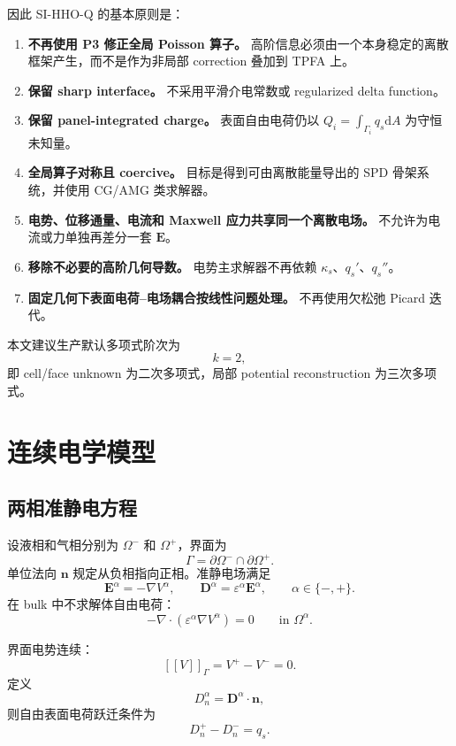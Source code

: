 \documentclass[UTF8,a4paper,11pt]{ctexart}
\newcommand{\dd}{\mathrm{d}}
\newcommand{\jump}[1]{\left[\!\left[#1\right]\!\right]}
\newcommand{\eps}{\varepsilon}
\newcommand{\vct}[1]{\bm{#1}}
\begin{document}
因此 SI-HHO-Q 的基本原则是：
\begin{enumerate}[label=\arabic*)]
  \item \textbf{不再使用 P3 修正全局 Poisson 算子。} 高阶信息必须由一个本身稳定的离散框架产生，而不是作为非局部 correction 叠加到 TPFA 上。
  \item \textbf{保留 sharp interface。} 不采用平滑介电常数或 regularized delta function。
  \item \textbf{保留 panel-integrated charge。} 表面自由电荷仍以 \(Q_i=\int_{\Gamma_i}q_s\dd A\) 为守恒未知量。
  \item \textbf{全局算子对称且 coercive。} 目标是得到可由离散能量导出的 SPD 骨架系统，并使用 CG/AMG 类求解器。
  \item \textbf{电势、位移通量、电流和 Maxwell 应力共享同一个离散电场。} 不允许为电流或力单独再差分一套 \(\vct E\)。
  \item \textbf{移除不必要的高阶几何导数。} 电势主求解器不再依赖 \(\kappa_s\)、\(q_s'\)、\(q_s''\)。
  \item \textbf{固定几何下表面电荷--电场耦合按线性问题处理。} 不再使用欠松弛 Picard 迭代。
\end{enumerate}

本文建议生产默认多项式阶次为
\[
\boxed{k=2},
\]
即 cell/face unknown 为二次多项式，局部 potential reconstruction 为三次多项式。

\section{连续电学模型}

\subsection{两相准静电方程}

设液相和气相分别为 \(\Omega^-\) 和 \(\Omega^+\)，界面为
\[
\Gamma=\partial\Omega^-\cap\partial\Omega^+.
\]
单位法向 \(\vct n\) 规定从负相指向正相。准静电场满足
\[
\vct E^\alpha=-\nabla V^\alpha,\qquad
\vct D^\alpha=\eps^\alpha\vct E^\alpha,
\qquad \alpha\in\{-,+\}.
\]
在 bulk 中不求解体自由电荷：
\begin{equation}
-\nabla\cdot\left(\eps^\alpha\nabla V^\alpha\right)=0
\qquad\text{in }\Omega^\alpha.
\label{eq:bulk_poisson}
\end{equation}

界面电势连续：
\begin{equation}
\jump{V}_\Gamma=V^+-V^-=0.
\label{eq:potential_continuity}
\end{equation}
定义
\[
D_n^\alpha=\vct D^\alpha\cdot\vct n,
\]
则自由表面电荷跃迁条件为
\begin{equation}
D_n^+-D_n^-=q_s.
\label{eq:D_jump}
\end{equation}
\end{document}
